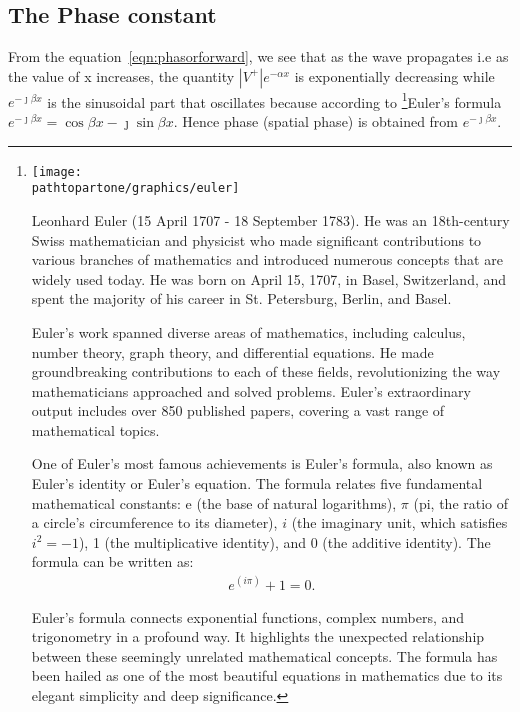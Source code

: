 \subsection{The Phase constant}
From the equation~\eqref{eqn:phasorforward}, we see that as the wave propagates i.e as the value of x increases, the quantity $\left|V^+\right|e^{-\alpha x}$ is exponentially decreasing while $e^{-\jmath\beta x}$ is the sinusoidal part that oscillates because according to \footnote{
\texttt{[image: \\pathtopartone/graphics/euler]}

Leonhard Euler (15 April 1707 - 18 September 1783). He was an 18th-century Swiss mathematician and physicist who made significant contributions to various branches of mathematics and introduced numerous concepts that are widely used today. He was born on April 15, 1707, in Basel, Switzerland, and spent the majority of his career in St. Petersburg, Berlin, and Basel.

Euler's work spanned diverse areas of mathematics, including calculus, number theory, graph theory, and differential equations. He made groundbreaking contributions to each of these fields, revolutionizing the way mathematicians approached and solved problems. Euler's extraordinary output includes over 850 published papers, covering a vast range of mathematical topics.

One of Euler's most famous achievements is Euler's formula, also known as Euler's identity or Euler's equation. The formula relates five fundamental mathematical constants: e (the base of natural logarithms), $\pi$ (pi, the ratio of a circle's circumference to its diameter), $i$ (the imaginary unit, which satisfies $i^2 = -1$), 1 (the multiplicative identity), and 0 (the additive identity). The formula can be written as:
\begin{align*}
e^(i\pi) + 1 = 0.
\end{align*}

Euler's formula connects exponential functions, complex numbers, and trigonometry in a profound way. It highlights the unexpected relationship between these seemingly unrelated mathematical concepts. The formula has been hailed as one of the most beautiful equations in mathematics due to its elegant simplicity and deep significance.
}Euler's formula $e^{-\jmath\beta x} = \cos{\beta x} - \jmath \sin{ \beta x}$. Hence phase (spatial phase) is obtained from $e^{-\jmath\beta x}$.

